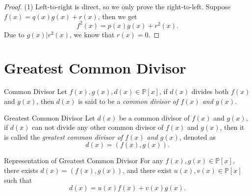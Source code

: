 \begin{proof}
  (1) Left-to-right is direct, so we only prove the right-to-left.
  Suppose $f(x) = q(x)g(x) + r(x)$, then we get
  \begin{equation}
    f^2(x) = p(x)g(x) + r^2(x).
  \end{equation}
  Due to $g(x) | r^2(x)$, we know that $r(x) = 0$.
\end{proof}

\section{Greatest Common Divisor}

\begin{definition}{Common Divisor}{}
  Let $f(x), g(x), d(x) \in \mathbb{P}[x]$,
  if $d(x)$ divides both $f(x)$ and $g(x)$,
  then $d(x)$ is said to be a \emph{common divisor of $f(x)$ and $g(x)$}.
\end{definition}

\begin{definition}{Greatest Common Divisor}{}
  Let $d(x)$ be a common divisor of $f(x)$ and $g(x)$,
  if $d(x)$ can not divide any other common divisor of $f(x)$ and $g(x)$,
  then it is called the \emph{greatest common divisor of $f(x)$ and $g(x)$},
  denoted as
  \begin{equation}
    d(x) = \left( f(x), g(x) \right).
  \end{equation}
\end{definition}

\begin{theorem}{Representation of Greatest Common Divisor}{}
  For any $f(x), g(x) \in \mathbb{P}[x]$,
  there exists $d(x) = (f(x), g(x))$, and there exist $u(x), v(x) \in \mathbb{P}[x]$
  such that
  \begin{equation}
    d(x) = u(x) f(x) + v(x) g(x).
  \end{equation}
\end{theorem}

